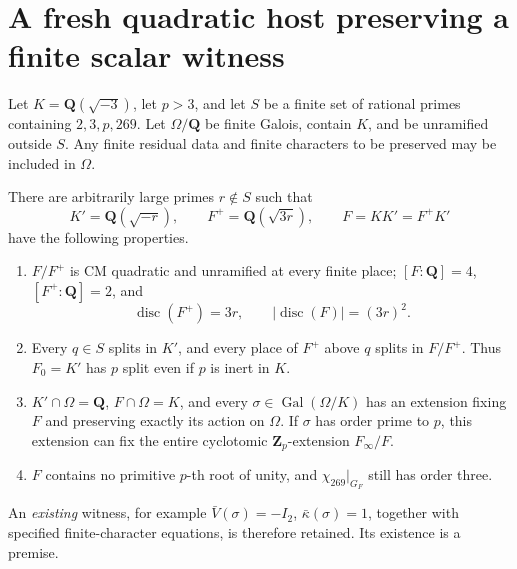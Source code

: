 \section{A fresh quadratic host preserving a finite scalar witness}
\label{sec:cubic-fresh-quadratic-host}

\begin{proposition}
\label{prop:ACG77}
Let \(K=\mathbf Q(\sqrt{-3})\), let \(p>3\), and let \(S\) be a finite set of rational primes containing \(2,3,p,269\). Let \(\Omega/\mathbf Q\) be finite Galois, contain \(K\), and be unramified outside \(S\). Any finite residual data and finite characters to be preserved may be included in \(\Omega\).

There are arbitrarily large primes \(r\notin S\) such that
\[
 K'=\mathbf Q(\sqrt{-r}),\qquad F^+=\mathbf Q(\sqrt{3r}),\qquad
 F=KK'=F^+K'
 \tag{G77.1}
\]
have the following properties.
\begin{enumerate}
 \item \(F/F^+\) is CM quadratic and unramified at every finite place;
 \([F:\mathbf Q]=4\), \([F^+:\mathbf Q]=2\), and
 \[
 \operatorname{disc}(F^+)=3r,\qquad
 |\operatorname{disc}(F)|=(3r)^2.
 \tag{G77.2}
 \]
 \item Every \(q\in S\) splits in \(K'\), and every place of \(F^+\) above \(q\) splits in \(F/F^+\). Thus \(F_0=K'\) has \(p\) split even if \(p\) is inert in \(K\).
 \item \(K'\cap\Omega=\mathbf Q\), \(F\cap\Omega=K\), and every
 \(\sigma\in\operatorname{Gal}(\Omega/K)\) has an extension fixing \(F\) and preserving exactly its action on \(\Omega\).
 If \(\sigma\) has order prime to \(p\), this extension can fix the entire cyclotomic \(\mathbf Z_p\)-extension \(F_\infty/F\).
 \item \(F\) contains no primitive \(p\)-th root of unity, and \(\chi_{269}|_{G_F}\) still has order three.
\end{enumerate}
An \emph{existing} witness, for example
\(\bar V(\sigma)=-I_2\), \(\bar\kappa(\sigma)=1\), together with specified finite-character equations, is therefore retained. Its existence is a premise.
\end{proposition}

